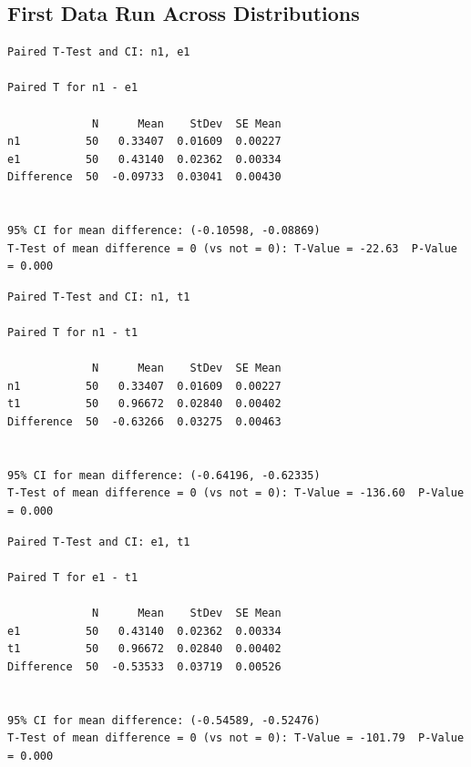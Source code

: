 \documentclass[letterpaper,10pt]{article}
\begin{document}
\subsection{First Data Run Across Distributions}
\begin{samepage}
\begin{verbatim}
Paired T-Test and CI: n1, e1 

Paired T for n1 - e1

             N      Mean    StDev  SE Mean
n1          50   0.33407  0.01609  0.00227
e1          50   0.43140  0.02362  0.00334
Difference  50  -0.09733  0.03041  0.00430


95% CI for mean difference: (-0.10598, -0.08869)
T-Test of mean difference = 0 (vs not = 0): T-Value = -22.63  P-Value = 0.000
\end{verbatim}
\end{samepage}
\begin{samepage}
\begin{verbatim}
Paired T-Test and CI: n1, t1 

Paired T for n1 - t1

             N      Mean    StDev  SE Mean
n1          50   0.33407  0.01609  0.00227
t1          50   0.96672  0.02840  0.00402
Difference  50  -0.63266  0.03275  0.00463


95% CI for mean difference: (-0.64196, -0.62335)
T-Test of mean difference = 0 (vs not = 0): T-Value = -136.60  P-Value = 0.000
\end{verbatim}
\end{samepage}
\begin{samepage}
\begin{verbatim}
Paired T-Test and CI: e1, t1 

Paired T for e1 - t1

             N      Mean    StDev  SE Mean
e1          50   0.43140  0.02362  0.00334
t1          50   0.96672  0.02840  0.00402
Difference  50  -0.53533  0.03719  0.00526


95% CI for mean difference: (-0.54589, -0.52476)
T-Test of mean difference = 0 (vs not = 0): T-Value = -101.79  P-Value = 0.000
\end{verbatim}
\end{samepage}
\end{document}
